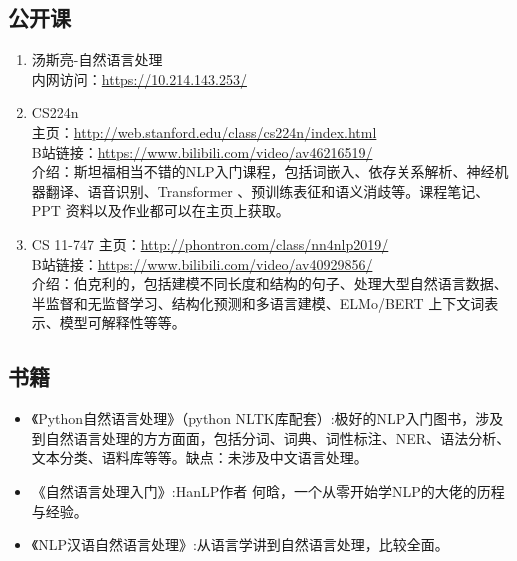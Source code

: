 \documentclass[lang=cn,11pt,a4paper]{eleganttemplate}
\begin{document}
\subsection{公开课}
\begin{enumerate}
    \item 汤斯亮-自然语言处理 \\
    内网访问：\href{https://10.214.143.253/}{https://10.214.143.253/} 
    \item CS224n \\
    主页：\href{http://web.stanford.edu/class/cs224n/index.html}{http://web.stanford.edu/class/cs224n/index.html} \\
    B站链接：\href{https://www.bilibili.com/video/av46216519/}{https://www.bilibili.com/video/av46216519/}  \\
    介绍：斯坦福相当不错的NLP入门课程，包括词嵌入、依存关系解析、神经机器翻译、语音识别、Transformer 、预训练表征和语义消歧等。课程笔记、PPT 资料以及作业都可以在主页上获取。
    \item CS 11-747
    主页：\href{http://phontron.com/class/nn4nlp2019/}{http://phontron.com/class/nn4nlp2019/}  \\
    B站链接：\href{https://www.bilibili.com/video/av40929856/}{https://www.bilibili.com/video/av40929856/}  \\
    介绍：伯克利的，包括建模不同长度和结构的句子、处理大型自然语言数据、半监督和无监督学习、结构化预测和多语言建模、ELMo/BERT 上下文词表示、模型可解释性等等。
\end{enumerate}


\subsection{书籍}
\begin{itemize}
    \item 《Python自然语言处理》（python NLTK库配套）:极好的NLP入门图书，涉及到自然语言处理的方方面面，包括分词、词典、词性标注、NER、语法分析、文本分类、语料库等等。缺点：未涉及中文语言处理。
    \item 《自然语言处理入门》:HanLP作者 何晗，一个从零开始学NLP的大佬的历程与经验。
    \item 《NLP汉语自然语言处理》:从语言学讲到自然语言处理，比较全面。
\end{itemize}
\end{document}
